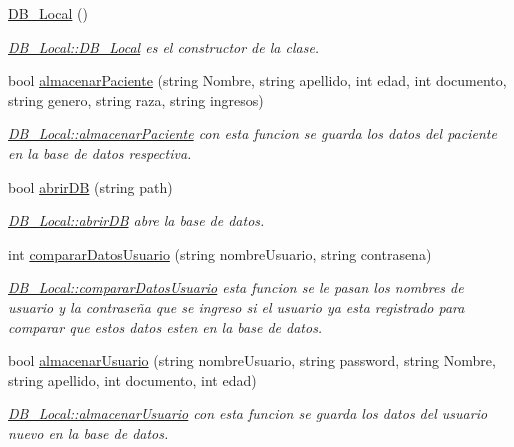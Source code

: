 \begin{DoxyCompactItemize}
\item 
\mbox{\label{class_d_b___local_a439c348ad67f06527f46ee2ddbfbcb05}} 
\hyperlink{class_d_b___local_a439c348ad67f06527f46ee2ddbfbcb05}{D\+B\+\_\+\+Local} ()
\begin{DoxyCompactList}\small\item\em \hyperlink{class_d_b___local_a439c348ad67f06527f46ee2ddbfbcb05}{D\+B\+\_\+\+Local\+::\+D\+B\+\_\+\+Local} es el constructor de la clase. \end{DoxyCompactList}\item 
bool \hyperlink{class_d_b___local_af177cdf53157cb7da307a50b95b19001}{almacenar\+Paciente} (string Nombre, string apellido, int edad, int documento, string genero, string raza, string ingresos)
\begin{DoxyCompactList}\small\item\em \hyperlink{class_d_b___local_af177cdf53157cb7da307a50b95b19001}{D\+B\+\_\+\+Local\+::almacenar\+Paciente} con esta funcion se guarda los datos del paciente en la base de datos respectiva. \end{DoxyCompactList}\item 
bool \hyperlink{class_d_b___local_ad8637aa272a8a361ae2a6e1e7f8cd71c}{abrir\+DB} (string path)
\begin{DoxyCompactList}\small\item\em \hyperlink{class_d_b___local_ad8637aa272a8a361ae2a6e1e7f8cd71c}{D\+B\+\_\+\+Local\+::abrir\+DB} abre la base de datos. \end{DoxyCompactList}\item 
int \hyperlink{class_d_b___local_a7812291d7772ef9b4a4e4bfe0cac3a09}{comparar\+Datos\+Usuario} (string nombre\+Usuario, string contrasena)
\begin{DoxyCompactList}\small\item\em \hyperlink{class_d_b___local_a7812291d7772ef9b4a4e4bfe0cac3a09}{D\+B\+\_\+\+Local\+::comparar\+Datos\+Usuario} esta funcion se le pasan los nombres de usuario y la contraseña que se ingreso si el usuario ya esta registrado para comparar que estos datos esten en la base de datos. \end{DoxyCompactList}\item 
bool \hyperlink{class_d_b___local_a021938e1e159fd8c2f6876f2a74d6655}{almacenar\+Usuario} (string nombre\+Usuario, string password, string Nombre, string apellido, int documento, int edad)
\begin{DoxyCompactList}\small\item\em \hyperlink{class_d_b___local_a021938e1e159fd8c2f6876f2a74d6655}{D\+B\+\_\+\+Local\+::almacenar\+Usuario} con esta funcion se guarda los datos del usuario nuevo en la base de datos. \end{DoxyCompactList}\item 

\end{DoxyCompactItemize}
